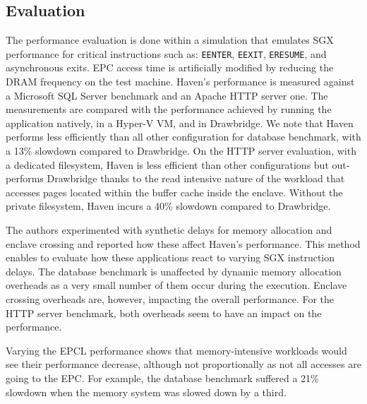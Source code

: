 \subsection{Evaluation}
%
The performance evaluation is done within a simulation that emulates SGX performance for critical instructions such as: \lstinline{EENTER}, \lstinline{EEXIT}, \lstinline{ERESUME}, and asynchronous exits.
EPC access time is artificially modified by reducing the DRAM frequency on the test machine.
Haven's performance is measured against a Microsoft SQL Server benchmark and an Apache HTTP server one.
The measurements are compared with the performance achieved by running the application natively, in a Hyper-V VM, and in Drawbridge.
We note that Haven performs less efficiently than all other configuration for database benchmark, with a 13\% slowdown compared to Drawbridge.
On the HTTP server evaluation, with a dedicated filesystem, Haven is less efficient than other configurations but out-performs Drawbridge thanks to the read intensive nature of the workload that accesses pages located within the buffer cache inside the enclave.
Without the private filesystem, Haven incurs a 40\% slowdown compared to Drawbridge.

The authors experimented with synthetic delays for memory allocation and enclave crossing and reported how these affect Haven's performance.
This method enables to evaluate how these applications react to varying SGX instruction delays.
The database benchmark is unaffected by dynamic memory allocation overheads as a very small number of them occur during the execution.
Enclave crossing overheads are, however, impacting the overall performance.
For the HTTP server benchmark, both overheads seem to have an impact on the performance.

Varying the EPCL performance shows that memory-intensive workloads would see their performance decrease, although not proportionally as not all accesses are going to the EPC.
For example, the database benchmark suffered a 21\% slowdown when the memory system was slowed down by a third.


